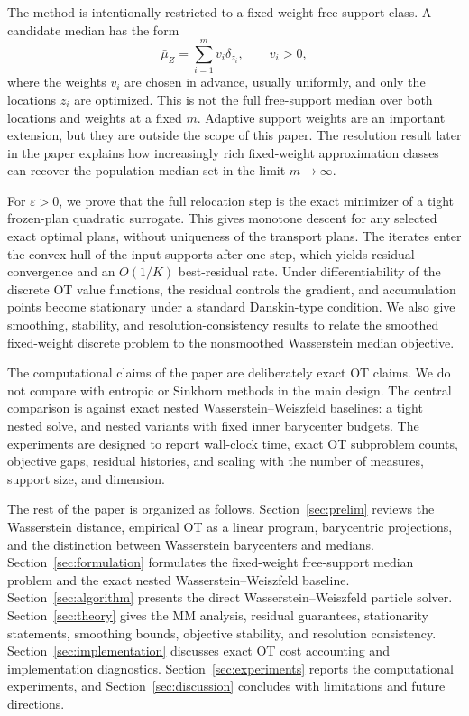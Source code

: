 \documentclass[pdflatex,sn-mathphys-ay]{sn-jnl}%
\theoremstyle{thmstyleone}%
\theoremstyle{thmstyletwo}%
\theoremstyle{thmstylethree}%
\newcommand{\eps}{\varepsilon}
\newcommand{\barmu}{\bar\mu}
\begin{document}
The method is intentionally restricted to a fixed-weight free-support class. A candidate median has the form
\[
    \barmu_Z=\sum_{i=1}^m v_i\delta_{z_i},\qquad v_i>0,
\]
where the weights \(v_i\) are chosen in advance, usually uniformly, and only the locations \(z_i\) are optimized. This is not the full free-support median over both locations and weights at a fixed \(m\). Adaptive support weights are an important extension, but they are outside the scope of this paper. The resolution result later in the paper explains how increasingly rich fixed-weight approximation classes can recover the population median set in the limit \(m\to\infty\).

For \(\eps>0\), we prove that the full relocation step is the exact minimizer of a tight frozen-plan quadratic surrogate. This gives monotone descent for any selected exact optimal plans, without uniqueness of the transport plans. The iterates enter the convex hull of the input supports after one step, which yields residual convergence and an \(O(1/K)\) best-residual rate. Under differentiability of the discrete OT value functions, the residual controls the gradient, and accumulation points become stationary under a standard Danskin-type condition. We also give smoothing, stability, and resolution-consistency results to relate the smoothed fixed-weight discrete problem to the nonsmoothed Wasserstein median objective.

The computational claims of the paper are deliberately exact OT claims. We do not compare with entropic or Sinkhorn methods in the main design. The central comparison is against exact nested Wasserstein--Weiszfeld baselines: a tight nested solve, and nested variants with fixed inner barycenter budgets. The experiments are designed to report wall-clock time, exact OT subproblem counts, objective gaps, residual histories, and scaling with the number of measures, support size, and dimension.

The rest of the paper is organized as follows. Section~\ref{sec:prelim} reviews the Wasserstein distance, empirical OT as a linear program, barycentric projections, and the distinction between Wasserstein barycenters and medians. Section~\ref{sec:formulation} formulates the fixed-weight free-support median problem and the exact nested Wasserstein--Weiszfeld baseline. Section~\ref{sec:algorithm} presents the direct Wasserstein--Weiszfeld particle solver. Section~\ref{sec:theory} gives the MM analysis, residual guarantees, stationarity statements, smoothing bounds, objective stability, and resolution consistency. Section~\ref{sec:implementation} discusses exact OT cost accounting and implementation diagnostics. Section~\ref{sec:experiments} reports the computational experiments, and Section~\ref{sec:discussion} concludes with limitations and future directions.
\end{document}
